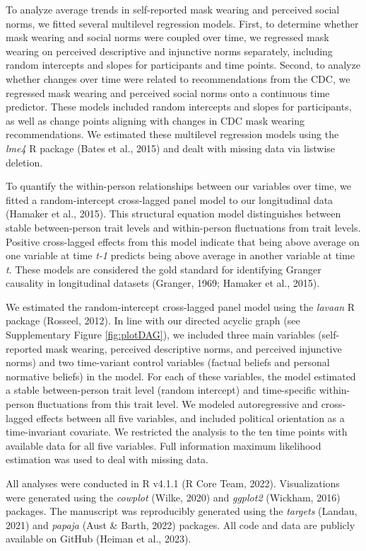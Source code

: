 \documentclass[
  man, donotrepeattitle,mask,floatsintext]{apa6}
\begin{document}
To analyze average trends in self-reported mask wearing and perceived social norms, we fitted several multilevel regression models. First, to determine whether mask wearing and social norms were coupled over time, we regressed mask wearing on perceived descriptive and injunctive norms separately, including random intercepts and slopes for participants and time points. Second, to analyze whether changes over time were related to recommendations from the CDC, we regressed mask wearing and perceived social norms onto a continuous time predictor. These models included random intercepts and slopes for participants, as well as change points aligning with changes in CDC mask wearing recommendations. We estimated these multilevel regression models using the \emph{lme4} R package (Bates et al., 2015) and dealt with missing data via listwise deletion.

To quantify the within-person relationships between our variables over time, we fitted a random-intercept cross-lagged panel model to our longitudinal data (Hamaker et al., 2015). This structural equation model distinguishes between stable between-person trait levels and within-person fluctuations from trait levels. Positive cross-lagged effects from this model indicate that being above average on one variable at time \emph{t-1} predicts being above average in another variable at time \emph{t}. These models are considered the gold standard for identifying Granger causality in longitudinal datasets (Granger, 1969; Hamaker et al., 2015).

We estimated the random-intercept cross-lagged panel model using the \emph{lavaan} R package (Rosseel, 2012). In line with our directed acyclic graph (see Supplementary Figure \ref{fig:plotDAG}), we included three main variables (self-reported mask wearing, perceived descriptive norms, and perceived injunctive norms) and two time-variant control variables (factual beliefs and personal normative beliefs) in the model. For each of these variables, the model estimated a stable between-person trait level (random intercept) and time-specific within-person fluctuations from this trait level. We modeled autoregressive and cross-lagged effects between all five variables, and included political orientation as a time-invariant covariate. We restricted the analysis to the ten time points with available data for all five variables. Full information maximum likelihood estimation was used to deal with missing data.

All analyses were conducted in R v4.1.1 (R Core Team, 2022). Visualizations were generated using the \emph{cowplot} (Wilke, 2020) and \emph{ggplot2} (Wickham, 2016) packages. The manuscript was reproducibly generated using the \emph{targets} (Landau, 2021) and \emph{papaja} (Aust \& Barth, 2022) packages. All code and data are publicly available on GitHub (Heiman et al., 2023).
\end{document}
